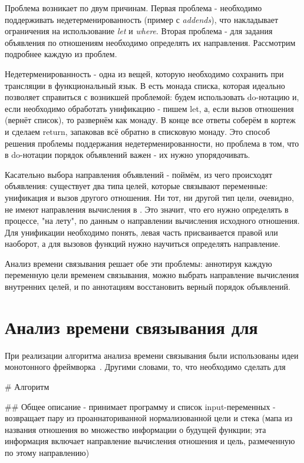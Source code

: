 \documentclass[conference]{IEEEtran}
\begin{document}
Проблема возникает по двум причинам. Первая проблема - необходимо поддерживать недетерменированность (пример с \emph{addends}), что накладывает ограничения на использование \emph{let} и \emph{where}. Вторая проблема - для задания объявления по отношениям необходимо определять их направления. Рассмотрим подробнее каждую из проблем.

Недетерменированность - одна из вещей, которую необходимо сохранить при трансляции в функциональный язык. В \haskell есть монада списка, которая идеально позволяет справиться с возникшей проблемой: будем использовать do-нотацию и, если необходимо обработать унификацию - пишем let, а, если вызов отношения (вернёт список), то развернём как монаду. В конце все ответы соберём в кортеж и сделаем return, запаковав всё обратно в списковую монаду. Это способ решения проблемы поддержания недетерменированности, но проблема в том, что в do-нотации порядок объявлений важен - их нужно упорядочивать.

Касательно выбора направления объявлений - поймём, из чего происходят объявления: существует два типа целей, которые связывают переменные: унификация и вызов другого отношения. Ни тот, ни другой тип цели, очевидно, не имеют направления вычисления в \miniKanren. Это значит, что его нужно определять в процессе, "на лету", по данным о направлении вычисления исходного отношения. Для унификации необходимо понять, левая часть присваивается правой или наоборот, а для вызовов функций нужно научиться определять направление.

Анализ времени связывания решает обе эти проблемы: аннотируя каждую переменную цели временем связывания, можно выбрать направление вычисления внутренних целей, и по аннотациям восстановить верный порядок объявлений.

\section{Анализ времени связывания для \miniKanren}

При реализации алгоритма анализа времени связывания были использованы идеи монотонного фреймворка~\cite{kam1977monotone}. Другими словами, то, что необходимо сделать для 

# Алгоритм

## Общее описание
- принимает программу и список input-переменных
- возвращает пару из проаннаториванной нормализованной цели и стека (мапа из названия отношения во множество информации о будущей функции; эта информация включает направление вычисления отношения и цель, размеченную по этому направлению)
\end{document}
